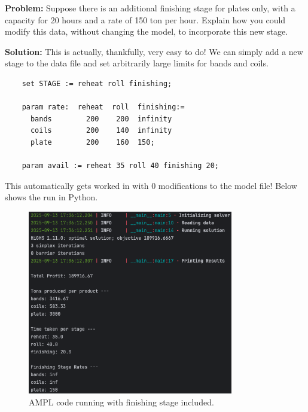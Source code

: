 \textbf{Problem:} Suppose there is an additional finishing stage for plates only, with a capacity for 20 hours and a rate of 150 ton per hour. Explain how you could modify this data, without changing the model, to incorporate this new stage. 

\noindent\textbf{Solution:} This is actually, thankfully, very easy to do! We can simply add a new stage to the data file and set arbitrarily large limits for bands and coils.

\begin{lstlisting}
	set STAGE := reheat roll finishing;

	param rate:  reheat  roll  finishing:=
	  bands        200    200  infinity
	  coils        200    140  infinity
	  plate        200    160  150;

	param avail := reheat 35 roll 40 finishing 20;
\end{lstlisting}

This automatically gets worked in with 0 modifications to the model file! Below shows the run in Python.

\begin{figure}[htbp]
    \centering
    \includegraphics[width=0.8\textwidth]{../images/hw4-part-e-run.png}
    \caption{AMPL code running with finishing stage included.}
    \label{fig:your_label}
\end{figure}
